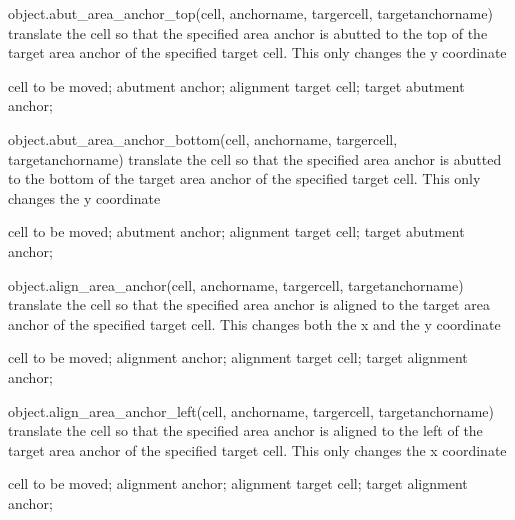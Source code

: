 \begin{APIfunc}{object.abut\_area\_anchor\_top(cell, anchorname, targercell, targetanchorname)}
    translate the cell so that the specified area anchor is abutted to the top of the target area anchor of the specified target cell. This only changes the y coordinate
    \begin{APIparameters}
            cell to be moved;
            abutment anchor;
            alignment target cell;
            target abutment anchor;
    \end{APIparameters}
\end{APIfunc}
\begin{APIfunc}{object.abut\_area\_anchor\_bottom(cell, anchorname, targercell, targetanchorname)}
    translate the cell so that the specified area anchor is abutted to the bottom of the target area anchor of the specified target cell. This only changes the y coordinate
    \begin{APIparameters}
            cell to be moved;
            abutment anchor;
            alignment target cell;
            target abutment anchor;
    \end{APIparameters}
\end{APIfunc}
\begin{APIfunc}{object.align\_area\_anchor(cell, anchorname, targercell, targetanchorname)}
    translate the cell so that the specified area anchor is aligned to the target area anchor of the specified target cell. This changes both the x and the y coordinate
    \begin{APIparameters}
            cell to be moved;
            alignment anchor;
            alignment target cell;
            target alignment anchor;
    \end{APIparameters}
\end{APIfunc}
\begin{APIfunc}{object.align\_area\_anchor\_left(cell, anchorname, targercell, targetanchorname)}
    translate the cell so that the specified area anchor is aligned to the left of the target area anchor of the specified target cell. This only changes the x coordinate
    \begin{APIparameters}
            cell to be moved;
            alignment anchor;
            alignment target cell;
            target alignment anchor;
    \end{APIparameters}
\end{APIfunc}
